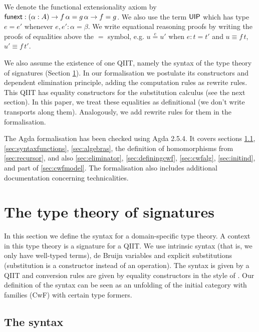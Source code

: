 \documentclass[acmsmall,review,anonymous]{acmart}\settopmatter{printfolios=true,printccs=false,printacmref=false}
\begin{document}
We denote the functional extensionality axiom by $\mathsf{funext} : (\alpha :
A)\rightarrow f\,\alpha = g\,\alpha \rightarrow f = g$. We also use the term $\mathsf{UIP}$
which has type $e = e'$ whenever $e,e':\alpha=\beta$. We write
equational reasoning proofs by writing the proofs of equalities above
the $=$ symbol, e.g. $u \overset{e}{=} u'$ when $e:t = t'$ and
$u\equiv f\,t$, $u'\equiv f\,t'$.

We also assume the existence of one QIIT, namely the syntax of the
type theory of signatures (Section \ref{sec:signatures}). In our
formalisation we postulate its constructors and dependent elimination
principle, adding the computation rules as rewrite rules. This QIIT has
equality constructors for the substitution calculus (see the next
section). In this paper, we treat these equalities as definitional (we
don't write transports along them). Analogously, we add rewrite rules
for them in the formalisation.

The Agda formalisation has been checked using Agda 2.5.4. It covers
sections \ref{sec:syntax}, \ref{sec:syntaxfunctions},
\ref{sec:algebras}, the definition of homomorphisms from
\ref{sec:recursor}, and also \ref{sec:eliminator},
\ref{sec:definingcwf}, \ref{sec:cwfalg}, \ref{sec:initind}, and part
of \ref{sec:cwfmodel}. The formalisation also includes additional
documentation concerning technicalities.



\section{The type theory of signatures}
\label{sec:signatures}

In this section we define the syntax for a domain-specific type
theory. A context in this type theory is a signature for a QIIT. We
use intrinsic syntax (that is, we only have well-typed terms), de
Bruijn variables and explicit substitutions (substitution is a
constructor instead of an operation). The syntax is given by a QIIT
and conversion rules are given by equality constructors in the style
of \cite{ttintt}. Our definition of the syntax can be seen as an
unfolding of the initial category with families (CwF)
\cite{Dybjer96internaltype} with certain type formers.

\subsection{The syntax}
\label{sec:syntax}
\end{document}

